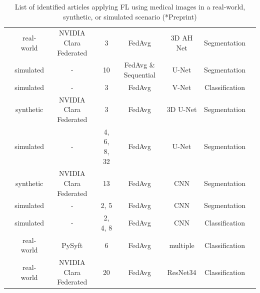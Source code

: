 \begin{table}
\begin{adjustbox}{width=1.0\textheight}
\begin{tabular}{cccccccc}
    \cite{Sarma2021FederatedSharing}                    & real-world & NVIDIA Clara Federated   & 3             & FedAvg                    & 3D AH Net         & Segmentation \\
    \cite{Sheller2020FederatedData}                     & simulated  & -                        & 10            & FedAvg \& Sequential      & U-Net             & Segmentation \\
    \cite{Baheti2020FederatedNodules}                   & simulated  & -                        & 3             & FedAvg                    & V-Net             & Classification \\    
    \cite{Yang2021FederatedJapan}                       & synthetic  & NVIDIA Clara Federated   & 3             & FedAvg                    & 3D U-Net          & Segmentation \\  
    \cite{Sheller2019Multi-institutionalSegmentation}   & simulated  & -                        & 4, 6, 8, 32   & FedAvg                    & U-Net             & Segmentation \\
    \cite{Li2019Privacy-preservingSegmentation}         & synthetic  & NVIDIA Clara Federated   & 13            & FedAvg                    & CNN               & Segmentation \\
    \cite{Andreux2020SiloedDatasets}                    & simulated  & -                        & 2, 5          & FedAvg                    & CNN               & Segmentation \\
    \cite{Yan2020Variation-AwareData}                   & simulated  & -                        & 2, 4, 8       & FedAvg                    & CNN               & Classification \\
    \cite{Lee2021FederatedEnvironment}                  & real-world & PySyft                   & 6             & FedAvg                    & multiple          & Classification \\
    \cite{Flores2021FederatedPatients}\rlap{*}          & real-world & NVIDIA Clara Federated   & 20            & FedAvg                    & ResNet34          & Classification \\
  \end{tabular}
  \end{adjustbox}
  \caption[Identified articles applying FL using medical image data]{List of identified articles applying FL using medical images in a real-world, synthetic, or simulated scenario (*Preprint)}
  \label{tab:LitSearch}
\end{table}

